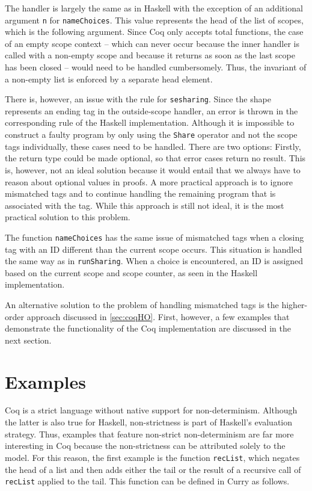 \documentclass[a4paper, 11pt, fleqn, twoside]{scrreprt}
\newcommand{\hinl}[1]{\texttt{#1}}
\newcommand{\cinl}[1]{\texttt{#1}}
\begin{document}
The handler is largely the same as in Haskell with the exception of an additional argument \cinl{n} for \cinl{nameChoices}.
This value represents the head of the list of scopes, which is the following argument.
Since Coq only accepts total functions, the case of an empty scope context -- which can never occur because the inner handler is called with a non-empty scope and because it returns as soon as the last scope has been closed -- would need to be handled cumbersomely.
Thus, the invariant of a non-empty list is enforced by a separate head element.

There is, however, an issue with the rule for \cinl{sesharing}.
Since the shape represents an ending tag in the outside-scope handler, an error is thrown in the corresponding rule of the Haskell implementation.
Although it is impossible to construct a faulty program by only using the \cinl{Share} operator and not the scope tags individually, these cases need to be handled.
There are two options: Firstly, the return type could be made optional, so that error cases return no result.
This is, however, not an ideal solution because it would entail that we always have to reason about optional values in proofs.
A more practical approach is to ignore mismatched tags and to continue handling the remaining program that is associated with the tag.
While this approach is still not ideal, it is the most practical solution to this problem.

The function \cinl{nameChoices} has the same issue of mismatched tags when a closing tag with an ID different than the current scope occurs.
This situation is handled the same way as in \cinl{runSharing}.
When a choice is encountered, an ID is assigned based on the current scope and scope counter, as seen in the Haskell implementation.

An alternative solution to the problem of handling mismatched tags is the higher-order approach discussed in \autoref{sec:coqHO}.
First, however, a few examples that demonstrate the functionality of the Coq implementation are discussed in the next section.

\section{Examples}
Coq is a strict language without native support for non-determinism.
Although the latter is also true for Haskell, non-strictness is part of Haskell's evaluation strategy.
Thus, examples that feature non-strict non-determinism are far more interesting in Coq because the non-strictness can be attributed solely to the model.
For this reason, the first example is the function \hinl{recList}, which negates the head of a list and then adds either the tail or the result of a recursive call of \hinl{recList} applied to the tail.
This function can be defined in Curry as follows. 
\end{document}
